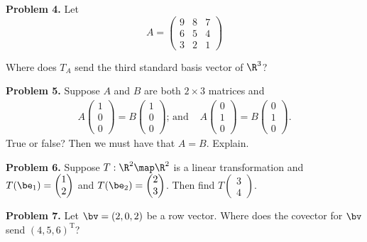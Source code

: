 \documentclass[oneside,12pt]{amsart}
\begin{document}
\bigskip
\bigskip
\bigskip
\bigskip
\bigskip
\bigskip

\textbf{Problem 4.}  Let
$$
A = \begin{pmatrix}
9 & 8 & 7 \\
6 & 5 & 4 \\
3 & 2 & 1
\end{pmatrix}
$$

Where does $T_A$ send the third standard basis vector of $\R^3$?

\bigskip
\bigskip

\textbf{Problem 5.} Suppose $A$ and $B$ are both $2\times 3$ matrices and
$$
\begin{matrix}
A \begin{pmatrix} 1 \\ 0 \\ 0 \end{pmatrix} = B \begin{pmatrix} 1 \\ 0 \\ 0 \end{pmatrix}\text{; and }
&
A \begin{pmatrix} 0 \\ 1 \\ 0 \end{pmatrix} = B \begin{pmatrix} 0 \\ 1 \\ 0 \end{pmatrix}\text{.}
\end{matrix}
$$
True or false? Then we must have that $A = B$. Explain.


\bigskip
\bigskip


\textbf{Problem 6.} Suppose $T:\R^2\map\R^2$ is a linear transformation and
$T(\be_1) = \begin{pmatrix} 1 \\ 2\end{pmatrix}$
and $T(\be_2) = \begin{pmatrix} 2 \\ 3\end{pmatrix}$. Then find
$T\begin{pmatrix} 3 \\ 4\end{pmatrix}$.


\bigskip
\bigskip
\bigskip
\bigskip
\bigskip
\bigskip


\textbf{Problem 7.} Let $\bv = (2, 0, 2)$ be a row vector. Where does
the covector for $\bv$ send $(4, 5, 6)^{\text{T}}$?
\end{document}
